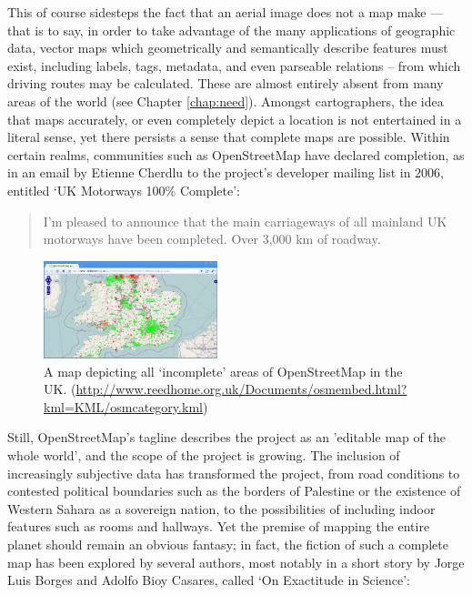 \documentclass[11pt,oneside,notitlepage]{report}
\begin{document}
This of course sidesteps the fact that an aerial image does not a map make --- that is to say, in order to take advantage of the many applications of geographic data, vector maps which geometrically and semantically describe features must exist, including labels, tags, metadata, and even parseable relations -- from which driving routes may be calculated. These are almost entirely absent from many areas of the world (see Chapter \ref{chap:need}). Amongst cartographers, the idea that maps accurately, or even completely depict a location is not entertained in a literal sense, yet there persists a sense that complete maps are possible. Within certain realms, communities such as OpenStreetMap have declared completion, as in an email by Etienne Cherdlu to the project's developer mailing list in 2006, entitled `UK Motorways 100\% Complete': \begin{quote}I'm pleased to announce that the main carriageways of all mainland UK motorways have been completed. Over 3,000 km of roadway.\end{quote}

\begin{figure}
	\begin{flushright}
		\includegraphics[width=0.45\textwidth]{images/osm-missing-parts.png}
	\caption{A map depicting all `incomplete' areas of OpenStreetMap in the UK. (\url{http://www.reedhome.org.uk/Documents/osmembed.html?kml=KML/osmcategory.kml})}
	\end{flushright}
\end{figure}

Still, OpenStreetMap's tagline describes the project as an 'editable map of the whole world', and the scope of the project is growing. The inclusion of increasingly subjective data has transformed the project, from road conditions to contested political boundaries such as the borders of Palestine or the existence of Western Sahara as a sovereign nation, to the possibilities of including indoor features such as rooms and hallways. Yet the premise of mapping the entire planet should remain an obvious fantasy; in fact, the fiction of such a complete map has been explored by several authors, most notably in a short story by Jorge Luis Borges and Adolfo Bioy Casares, called `On Exactitude in Science':
\end{document}
